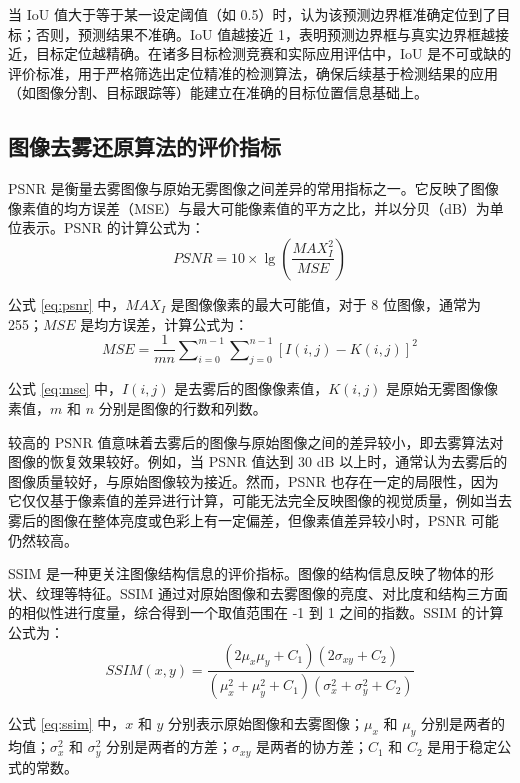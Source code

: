 当 IoU 值大于等于某一设定阈值（如 0.5）时，认为该预测边界框准确定位到了目标；否则，预测结果不准确。IoU 值越接近 1，表明预测边界框与真实边界框越接近，目标定位越精确。在诸多目标检测竞赛和实际应用评估中，IoU 是不可或缺的评价标准，用于严格筛选出定位精准的检测算法，确保后续基于检测结果的应用（如图像分割、目标跟踪等）能建立在准确的目标位置信息基础上。

\subsection{图像去雾还原算法的评价指标}

PSNR 是衡量去雾图像与原始无雾图像之间差异的常用指标之一。它反映了图像像素值的均方误差（MSE）与最大可能像素值的平方之比，并以分贝（dB）为单位表示。PSNR 的计算公式为：
\begin{equation}
    \label{eq:psnr}
    PSNR = 10 \times \lg(\frac{MAX_I^2}{MSE})
\end{equation}

公式 \ref{eq:psnr} 中，$MAX_I$ 是图像像素的最大可能值，对于 8 位图像，通常为 255；$MSE$ 是均方误差，计算公式为：
\begin{equation}
    \label{eq:mse}
    MSE = \frac{1}{mn} \sum\nolimits_{i=0}^{m-1} \sum\nolimits_{j=0}^{n-1} [I(i,j) - K(i,j)]^2
\end{equation}

公式 \ref{eq:mse} 中，$I(i,j)$ 是去雾后的图像像素值，$K(i,j)$ 是原始无雾图像像素值，$m$ 和 $n$ 分别是图像的行数和列数。

较高的 PSNR 值意味着去雾后的图像与原始图像之间的差异较小，即去雾算法对图像的恢复效果较好。例如，当 PSNR 值达到 30 dB 以上时，通常认为去雾后的图像质量较好，与原始图像较为接近。然而，PSNR 也存在一定的局限性，因为它仅仅基于像素值的差异进行计算，可能无法完全反映图像的视觉质量，例如当去雾后的图像在整体亮度或色彩上有一定偏差，但像素值差异较小时，PSNR 可能仍然较高。


SSIM 是一种更关注图像结构信息的评价指标。图像的结构信息反映了物体的形状、纹理等特征。SSIM 通过对原始图像和去雾图像的亮度、对比度和结构三方面的相似性进行度量，综合得到一个取值范围在 -1 到 1 之间的指数。SSIM 的计算公式为：
\begin{equation}
    \label{eq:ssim}
    SSIM(x, y) = \frac{(2 \mu_x \mu_y + C_1)(2 \sigma_{xy} + C_2)}{(\mu_x^2 + \mu_y^2 + C_1)(\sigma_x^2 + \sigma_y^2 + C_2)}
\end{equation}

公式 \ref{eq:ssim} 中，$x$ 和 $y$ 分别表示原始图像和去雾图像；$\mu_x$ 和 $\mu_y$ 分别是两者的均值；$\sigma_x^2$ 和 $\sigma_y^2$ 分别是两者的方差；$\sigma_{xy}$ 是两者的协方差；$C_1$ 和 $C_2$ 是用于稳定公式的常数。

